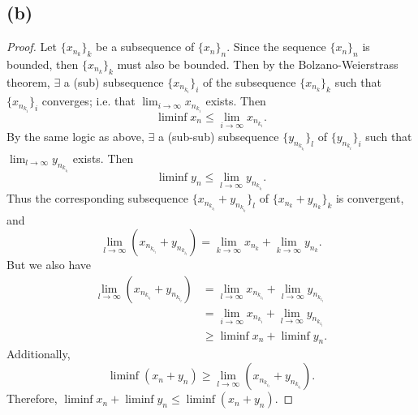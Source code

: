 \documentclass{article}
\begin{document}
\subsection*{(b)}
\begin{proof}
	Let $\{x_{n_k}\}_k$ be a subsequence of $\{x_n\}_n$. Since the sequence $\{x_n\}_n$ is bounded, then $\{x_{n_k}\}_k$ must also be bounded. Then by the Bolzano-Weierstrass theorem, $\exists$ a (sub) subsequence $\{x_{n_{k_i}}\}_i$ of the subsequence $\{x_{n_k}\}_k$ such that $\{x_{n_{k_i}}\}_i$ converges; i.e. that $\lim_{i\to\infty} x_{n_{k_i}}$ exists. Then
	\begin{equation}
		\liminf x_n \leq \lim_{i\to\infty} x_{n_{k_i}}.
	\end{equation}
	By the same logic as above, $\exists$ a (sub-sub) subsequence $\{y_{n_{k_{i_l}}}\}_l$ of $\{y_{n_{k_i}}\}_i$ such that $\lim_{l\to\infty} y_{n_{k_{i_l}}}$ exists. Then
	\begin{equation}
		\liminf y_n \leq \lim_{l \to \infty} y_{n_{k_{i_l}}}.
	\end{equation}
	Thus the corresponding subsequence $\{x_{n_{k_{i_l}}} + y_{n_{k_{i_l}}}\}_l$ of $\{x_{n_k} + y_{n_k}\}_k$ is convergent, and 
	\begin{equation}
		\lim_{l\to\infty}\left(x_{n_{k_{i_l}}} + y_{n_{k_{i_l}}}\right) = \lim_{k\to\infty} x_{n_k} + \lim_{k\to\infty} y_{n_k}.
	\end{equation}
	But we also have
	\begin{align}
		\lim_{l\to\infty}\left(x_{n_{k_{i_l}}} + y_{n_{k_{i_l}}}\right) &= \lim_{l\to\infty} x_{n_{k_{i_l}}} + \lim_{l\to\infty} y_{n_{k_{i_l}}}\\
		&= \lim_{i \to \infty} x_{n_{k_i}} + \lim_{l\to\infty} y_{n_{k_{i_l}}} \\
		& \geq \liminf x_n + \liminf y_n.
	\end{align}
	Additionally,
	\begin{equation}
		\liminf (x_n + y_n) \geq \lim_{l\to\infty}\left(x_{n_{k_{i_l}}} + y_{n_{k_{i_l}}}\right).
	\end{equation}
	Therefore, $\liminf x_n + \liminf y_n \leq \liminf (x_n + y_n)$. 
\end{proof}
\end{document}
